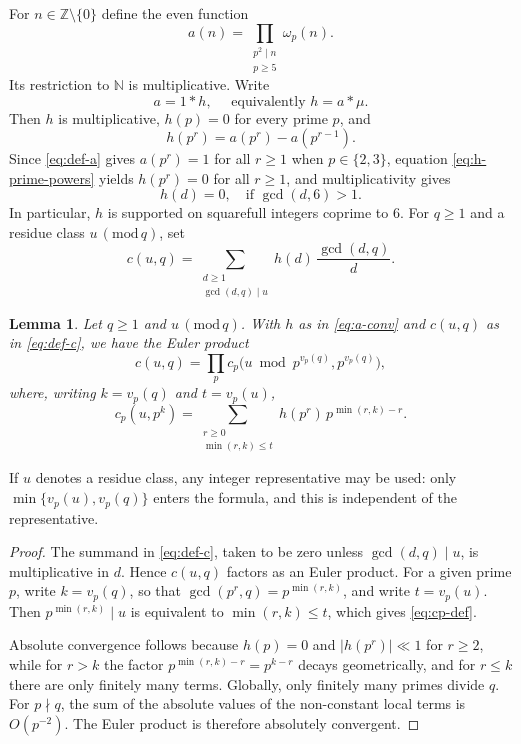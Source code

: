 \documentclass[12pt,reqno]{amsart}
\numberwithin{equation}{section}
\newtheorem{lemma}[theorem]{Lemma}
\theoremstyle{definition}
\renewcommand{\le}{\leqslant}
\renewcommand{\ge}{\geqslant}
\newcommand{\ZZ}{\mathbb{Z}}
\newcommand{\NN}{\mathbb{N}}
\renewcommand{\pmod}[1]{\,(\mathrm{mod}\,#1)}
\begin{document}
For $n\in\ZZ\setminus\{0\}$ define the even function
\begin{equation}\label{eq:def-a}
a(n)=\prod_{\substack{p^2\mid n\\ p\ge 5}}\omega_p(n).
\end{equation}
Its restriction to $\NN$ is multiplicative.
Write
\begin{equation}\label{eq:a-conv}
a=1*h, \quad \text{ equivalently } h=a*\mu.
\end{equation}
Then $h$ is multiplicative, $h(p)=0$ for every prime $p$, and
\begin{equation}\label{eq:h-prime-powers}
h(p^r)=a(p^r)-a(p^{r-1}).
\end{equation}
Since \eqref{eq:def-a} gives $a(p^r)=1$ for all $r\ge 1$ when $p\in\{2,3\}$, equation \eqref{eq:h-prime-powers} yields $h(p^r)=0$ for all $r\ge 1$, and multiplicativity gives
\begin{equation}\label{eq:h-coprime-6}
h(d)=0, \quad \text{if }\gcd(d,6)>1.
\end{equation}
In particular, $h$ is supported on squarefull integers coprime to $6$.
For $q\ge 1$ and a residue class $u\pmod{q}$, set
\begin{equation}\label{eq:def-c}
c(u,q)=\sum_{\substack{d\ge 1\\ \gcd(d,q)\mid u}}h(d)\,\frac{\gcd(d,q)}{d}.
\end{equation}

\begin{lemma}\label{lem:c-local}
Let $q\ge 1$ and $u\pmod q$.
With $h$ as in \eqref{eq:a-conv} and $c(u,q)$ as in \eqref{eq:def-c}, we have the Euler product
\[
c(u,q)=\prod_{p}c_p\bigl(u\bmod p^{v_p(q)},p^{v_p(q)}\bigr),
\]
where, writing $k=v_p(q)$ and $t=v_p(u)$,
\begin{equation}\label{eq:cp-def}
c_p(u,p^k)=\sum_{\substack{r\ge 0\\ \min(r,k)\le t}}h(p^r)\,p^{\min(r,k)-r}.
\end{equation}
\end{lemma}

If $u$ denotes a residue class, any integer representative may be used: only $\min\{v_p(u),v_p(q)\}$ enters the formula, and this is independent of the representative.

\begin{proof}
The summand in \eqref{eq:def-c}, taken to be zero unless $\gcd(d,q)\mid u$, is multiplicative in $d$.
Hence $c(u,q)$ factors as an Euler product.
For a given prime $p$, write $k=v_p(q)$, so that $\gcd(p^r,q)=p^{\min(r,k)}$, and write $t=v_p(u)$.
Then $p^{\min(r,k)}\mid u$ is equivalent to $\min(r,k)\le t$, which gives \eqref{eq:cp-def}.

Absolute convergence follows because $h(p)=0$ and $|h(p^r)|\ll 1$ for $r\ge 2$, while for $r>k$ the factor $p^{\min(r,k)-r}=p^{k-r}$ decays geometrically, and for $r\le k$ there are only finitely many terms.
Globally, only finitely many primes divide $q$.
For $p\nmid q$, the sum of the absolute values of the non-constant local terms is $O(p^{-2})$.
The Euler product is therefore absolutely convergent.
\end{proof}
\end{document}
